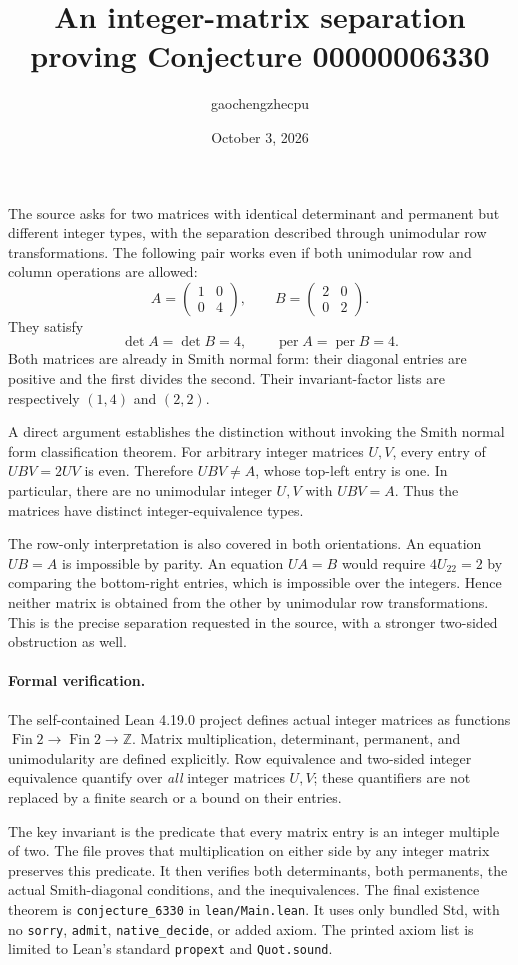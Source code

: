 \documentclass[11pt]{article}
\title{An integer-matrix separation proving Conjecture 00000006330}
\author{gaochengzhecpu}
\date{October 3, 2026}
\begin{document}
\maketitle

The source asks for two matrices with identical determinant and permanent
but different integer types, with the separation described through
unimodular row transformations. The following pair works even if both
unimodular row and column operations are allowed:
\[
 A=\begin{pmatrix}1&0\\0&4\end{pmatrix},\qquad
 B=\begin{pmatrix}2&0\\0&2\end{pmatrix}.
\]
They satisfy
\[
 \det A=\det B=4,\qquad
 \operatorname{per}A=\operatorname{per}B=4.
\]
Both matrices are already in Smith normal form: their diagonal entries
are positive and the first divides the second. Their invariant-factor
lists are respectively $(1,4)$ and $(2,2)$.

A direct argument establishes the distinction without invoking the Smith
normal form classification theorem. For arbitrary integer matrices $U,V$,
every entry of $UBV=2UV$ is even. Therefore $UBV\ne A$, whose top-left
entry is one. In particular, there are no unimodular integer $U,V$ with
$UBV=A$. Thus the matrices have distinct integer-equivalence types.

The row-only interpretation is also covered in both orientations.
An equation $UB=A$ is impossible by parity. An equation $UA=B$ would
require $4U_{22}=2$ by comparing the bottom-right entries, which is
impossible over the integers. Hence neither matrix is obtained from the
other by unimodular row transformations. This is the precise separation
requested in the source, with a stronger two-sided obstruction as well.

\paragraph{Formal verification.}
The self-contained Lean 4.19.0 project defines actual integer matrices
as functions $\operatorname{Fin}2\to\operatorname{Fin}2\to\mathbb Z$.
Matrix multiplication, determinant, permanent, and unimodularity are
defined explicitly. Row equivalence and two-sided integer equivalence
quantify over \emph{all} integer matrices $U,V$; these quantifiers are
not replaced by a finite search or a bound on their entries.

The key invariant is the predicate that every matrix entry is an integer
multiple of two. The file proves that multiplication on either side by
any integer matrix preserves this predicate. It then verifies both
determinants, both permanents, the actual Smith-diagonal conditions, and
the inequivalences. The final existence theorem is
\texttt{conjecture\_6330} in \texttt{lean/Main.lean}.
It uses only bundled Std, with no \texttt{sorry}, \texttt{admit},
\texttt{native\_decide}, or added axiom. The printed axiom list is limited
to Lean's standard \texttt{propext} and \texttt{Quot.sound}.
\end{document}
